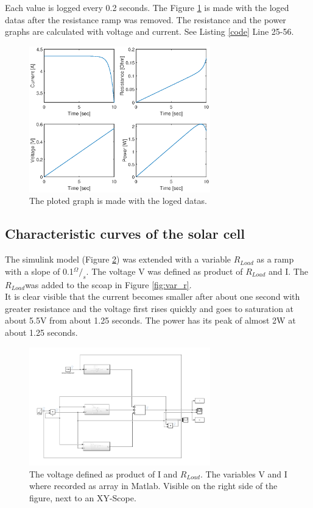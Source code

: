 	Each value is logged every 0.2 seconds. The Figure \ref{fig:plot} is made with the loged datas after the resistance ramp was removed. The resistance and the power graphs are calculated with voltage and current. See Listing \ref{code} Line 25-56.
	
		\begin{figure}[H]
			\centering
			\includegraphics[width=0.7\textwidth]{figures/logplot.eps}
			\caption{The ploted graph is made with the loged datas.}
			\label{fig:plot}
		\end{figure}
	
	
	
	\subsection{Characteristic curves of the solar cell}
	The simulink model (Figure \ref{fig:over2}) was extended with a variable $R_{Load}$ as a ramp with a slope of 0.1$^{\Omega}/_{s}$. The voltage V was defined as product of $R_{Load}$ and I. The $R_{Load} $was added to the scoap in Figure \ref{fig:var_r}.\\
	It is clear visible that the current becomes smaller after about one second with greater resistance and the voltage first rises quickly and goes to saturation at about 5.5V from about 1.25 seconds.
	The power has its peak of almost 2W at about 1.25 seconds.
		
		\begin{figure}[H]
			\centering
			\includegraphics[width=0.7\textwidth]{figures/over2.png}
			\caption[The voltage defined as product of I and $R_{Load}$.]{The voltage defined as product of I and $R_{Load}$. The variables V and I where recorded as array in Matlab. Visible on the right side of the figure, next to an XY-Scope.}
			\label{fig:over2}
		\end{figure}	
		
